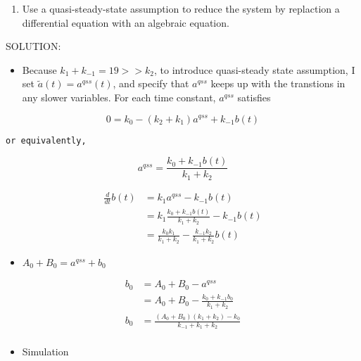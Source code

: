 \documentclass[11pt]{article}
\providecommand{\tightlist}{%
      \setlength{\itemsep}{0pt}\setlength{\parskip}{0pt}}
\begin{document}
    \begin{enumerate}
\def\labelenumi{(\alph{enumi})}
\setcounter{enumi}{1}
\tightlist
\item
  Use a quasi-steady-state assumption to reduce the system by replaction
  a differential equation with an algebraic equation.
\end{enumerate}

SOLUTION:

\begin{itemize}
\tightlist
\item
  Because \(k_{1} + k_{-1} = 19 >> k_{2}\), to introduce quasi-steady
  state assumption, I set \(\tilde{a}(t) = a^{qss}(t)\), and specify
  that \(a^{qss}\) keeps up with the transtions in any slower variables.
  For each time constant, \(a^{qss}\) satisfies
\end{itemize}

\[ 0 = k_{0} - (k_{2} + k_{1})a^{qss} + k_{-1}b(t) \]

\begin{verbatim}
or equivalently,
\end{verbatim}

\[a^{qss} = \frac{k_{0}+k_{-1}b(t)}{k_{1}+k_{2}}\]

\[\begin{align}
\frac{d}{dt}b(t) &= k_{1}a^{qss} - k_{-1}b(t) \\
                 &= k_{1}\frac{k_{0}+k_{-1}b(t)}{k_{1}+k_{2}}-k_{-1}b(t)\\
                 &= \frac{k_{0}k_{1}}{k_{1}+k_{2}}-\frac{k_{-1}k_{2}}{k_{1}+k_{2}}b(t)
\end{align}\]

    \begin{itemize}
\tightlist
\item
  \(A_{0} + B_{0} = a^{qss} + b_{0}\)
\end{itemize}

\[\begin{align}
b_{0} &= A_{0} + B_{0} - a^{qss} \\
      &= A_{0} + B_{0} - \frac{k_{0}+k_{-1}b_{0}}{k_{1}+k_{2}} \\
b_{0} &= \frac{(A_{0}+B_{0})(k_{1} + k_{2})-k_{0}}{k_{-1}+k_{1}+k_{2}} \\
\end{align}\]

    \begin{itemize}
\tightlist
\item
  Simulation
\end{itemize}
\end{document}

